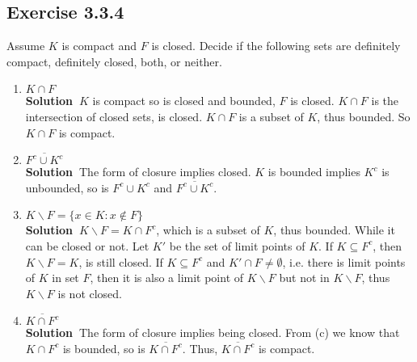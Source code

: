\documentclass[12pt]{report}
\newcommand{\sol}{{\textbf{Solution~}}}
\begin{document}
\subsection*{Exercise 3.3.4}
Assume $K$ is compact and $F$ is closed. Decide if the following
sets are definitely compact, definitely closed, both, or neither.
\begin{enumerate}[label=(\alph*)]
    \item $K \cap F$\\
    \sol $K$ is compact so is closed and bounded, $F$ is closed. $K \cap F$ is the intersection of closed sets, is closed. 
    $K \cap F$ is a subset of $K$, thus bounded. So $K \cap F$ is compact.
    \item $\overline{F^c \cup K^c}$\\
    \sol The form of closure implies closed. $K$ is bounded implies $K^c$ is unbounded, so is 
    $F^c \cup K^c$ and $\overline{F^c \cup K^c}$.
    \item $K\backslash F = \{x \in K: x\notin F\}$\\
    \sol $K\backslash F = K \cap F^c$, which is a subset of $K$, thus bounded. While it can be closed or not. 
    Let $K'$ be the set of limit points of $K$. If $K \subseteq F^c $, then $K\backslash F = K$, is still closed. 
    If $K \subseteq F^c$ and $K' \cap F \neq \emptyset$, i.e. there is limit points of $K$ in set $F$, 
    then it is also a limit point of $K\backslash F$ but not in $K\backslash F$, thus $K\backslash F$ is not closed.
    \item $\overline{K \cap F^c}$\\
    \sol The form of closure implies being closed. From (c) we know that $K \cap F^c$ is bounded, so is $\overline{K \cap F^c}$. 
    Thus, $\overline{K \cap F^c}$ is compact.
\end{enumerate}
\end{document}
